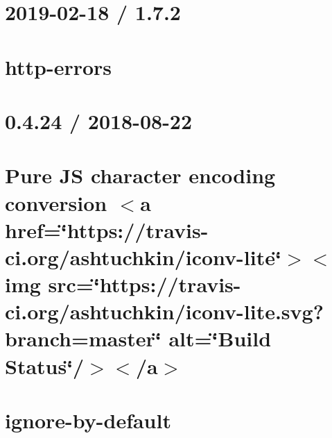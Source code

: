 \let\mypdfximage\pdfximage\def\pdfximage{\immediate\mypdfximage}\documentclass[twoside]{book}
\newcommand{\+}{\discretionary{\mbox{\scriptsize$\hookleftarrow$}}{}{}}
\begin{document}
\chapter{2019-\/02-\/18 / 1.7.2}
\label{md__c_1__git_hub__p_r_o_y_e_c_t_o-_i_i_i-_g_o_t_rest-api-node-mysql_node_modules_http-errors__h_i_s_t_o_r_y}

\chapter{http-\/errors}
\label{md__c_1__git_hub__p_r_o_y_e_c_t_o-_i_i_i-_g_o_t_rest-api-node-mysql_node_modules_http-errors__r_e_a_d_m_e}

\chapter{0.4.24 / 2018-\/08-\/22}
\label{md__c_1__git_hub__p_r_o_y_e_c_t_o-_i_i_i-_g_o_t_rest-api-node-mysql_node_modules_iconv-lite__changelog}

\chapter{Pure JS character encoding conversion $<$a href=\char`\"{}https\+://travis-\/ci.\+org/ashtuchkin/iconv-\/lite\char`\"{}$>$$<$img src=\char`\"{}https\+://travis-\/ci.\+org/ashtuchkin/iconv-\/lite.\+svg?branch=master\char`\"{} alt=\char`\"{}\+Build Status\char`\"{}/$>$$<$/a$>$}
\label{md__c_1__git_hub__p_r_o_y_e_c_t_o-_i_i_i-_g_o_t_rest-api-node-mysql_node_modules_iconv-lite__r_e_a_d_m_e}

\chapter{ignore-\/by-\/default}
\label{md__c_1__git_hub__p_r_o_y_e_c_t_o-_i_i_i-_g_o_t_rest-api-node-mysql_node_modules_ignore-by-default__r_e_a_d_m_e}

\end{document}
